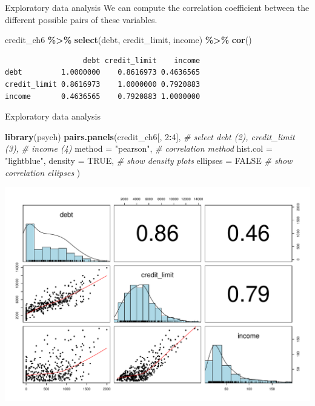 \documentclass[
  ignorenonframetext,
]{beamer}
\newenvironment{Shaded}{\begin{snugshade}}{\end{snugshade}}
\newcommand{\AttributeTok}[1]{\textcolor[rgb]{0.13,0.29,0.53}{#1}}
\newcommand{\CommentTok}[1]{\textcolor[rgb]{0.56,0.35,0.01}{\textit{#1}}}
\newcommand{\ConstantTok}[1]{\textcolor[rgb]{0.56,0.35,0.01}{#1}}
\newcommand{\DecValTok}[1]{\textcolor[rgb]{0.00,0.00,0.81}{#1}}
\newcommand{\FunctionTok}[1]{\textcolor[rgb]{0.13,0.29,0.53}{\textbf{#1}}}
\newcommand{\NormalTok}[1]{#1}
\newcommand{\SpecialCharTok}[1]{\textcolor[rgb]{0.81,0.36,0.00}{\textbf{#1}}}
\newcommand{\StringTok}[1]{\textcolor[rgb]{0.31,0.60,0.02}{#1}}
\begin{document}
\begin{frame}[fragile]{Exploratory data analysis}
\protect\hypertarget{exploratory-data-analysis-17}{}
We can compute the correlation coefficient between the different
possible pairs of these variables.

\normalsize

\begin{Shaded}
\begin{Highlighting}[]
\NormalTok{credit\_ch6 }\SpecialCharTok{\%\textgreater{}\%} 
  \FunctionTok{select}\NormalTok{(debt, credit\_limit, income) }\SpecialCharTok{\%\textgreater{}\%} 
  \FunctionTok{cor}\NormalTok{()}
\end{Highlighting}
\end{Shaded}

\begin{verbatim}
                  debt credit_limit    income
debt         1.0000000    0.8616973 0.4636565
credit_limit 0.8616973    1.0000000 0.7920883
income       0.4636565    0.7920883 1.0000000
\end{verbatim}

\normalsize
\end{frame}

\begin{frame}[fragile]{Exploratory data analysis}
\protect\hypertarget{exploratory-data-analysis-18}{}
\small

\begin{Shaded}
\begin{Highlighting}[]
\FunctionTok{library}\NormalTok{(psych)}
\FunctionTok{pairs.panels}\NormalTok{(credit\_ch6[, }\DecValTok{2}\SpecialCharTok{:}\DecValTok{4}\NormalTok{],  }\CommentTok{\# select debt (2), credit\_limit (3), }
             \CommentTok{\# income (4)}
             \AttributeTok{method =} \StringTok{"pearson"}\NormalTok{, }\CommentTok{\# correlation method}
             \AttributeTok{hist.col =} \StringTok{"lightblue"}\NormalTok{,}
             \AttributeTok{density =} \ConstantTok{TRUE}\NormalTok{,  }\CommentTok{\# show density plots}
             \AttributeTok{ellipses =} \ConstantTok{FALSE} \CommentTok{\# show correlation ellipses}
\NormalTok{             )}
\end{Highlighting}
\end{Shaded}

\begin{center}\includegraphics[width=0.6\linewidth,height=0.45\textheight]{Week5_Lect_files/figure-beamer/unnamed-chunk-41-1} \end{center}
\normalsize
\end{frame}
\end{document}
